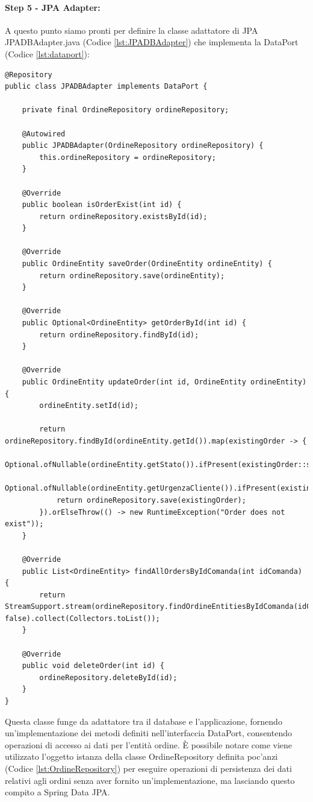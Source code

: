 \paragraph{Step 5 - JPA Adapter:}
A questo punto siamo pronti per definire la classe adattatore di JPA JPADBAdapter.java (Codice \vref{lst:JPADBAdapter}) che implementa la DataPort (Codice \vref{lst:dataport}):
\begin{lstlisting}[style=myJava, 
    caption={Classe adattatore JPA JPADBAdapter.java}, label=lst:JPADBAdapter, 
    emph={[2] ordineRepository, log, logger},
    emphstyle={[2]\color{codeDarkMagenta}},
    emph={[3] JPADBAdapter, isOrderExist, saveOrder, getOrderById, updateOrder, findAllOrdersByIdComanda, deleteOrder },
    emphstyle={[3]\color{codeCyan}},]
@Repository
public class JPADBAdapter implements DataPort {

    private final OrdineRepository ordineRepository;

    @Autowired
    public JPADBAdapter(OrdineRepository ordineRepository) {
        this.ordineRepository = ordineRepository;
    }

    @Override
    public boolean isOrderExist(int id) {
        return ordineRepository.existsById(id);
    }

    @Override
    public OrdineEntity saveOrder(OrdineEntity ordineEntity) {
        return ordineRepository.save(ordineEntity);
    }

    @Override
    public Optional<OrdineEntity> getOrderById(int id) {
        return ordineRepository.findById(id);
    }

    @Override
    public OrdineEntity updateOrder(int id, OrdineEntity ordineEntity) {
        ordineEntity.setId(id);

        return ordineRepository.findById(ordineEntity.getId()).map(existingOrder -> {
            Optional.ofNullable(ordineEntity.getStato()).ifPresent(existingOrder::setStato);
            Optional.ofNullable(ordineEntity.getUrgenzaCliente()).ifPresent(existingOrder::setUrgenzaCliente);
            return ordineRepository.save(existingOrder);
        }).orElseThrow(() -> new RuntimeException("Order does not exist"));
    }

    @Override
    public List<OrdineEntity> findAllOrdersByIdComanda(int idComanda) {
        return StreamSupport.stream(ordineRepository.findOrdineEntitiesByIdComanda(idComanda).spliterator(), false).collect(Collectors.toList());
    }

    @Override
    public void deleteOrder(int id) {
        ordineRepository.deleteById(id);
    }
}
\end{lstlisting}
Questa classe funge da adattatore tra il database e l'applicazione, fornendo un’implementazione dei metodi definiti nell’interfaccia DataPort, consentendo operazioni di accesso ai dati per l'entità ordine. È possibile notare come viene utilizzato l'oggetto istanza della classe OrdineRepository definita poc'anzi (Codice \vref{lst:OrdineRepository}) per eseguire operazioni di persistenza dei dati relativi agli ordini senza aver fornito un'implementazione, ma lasciando questo compito a Spring Data JPA.
